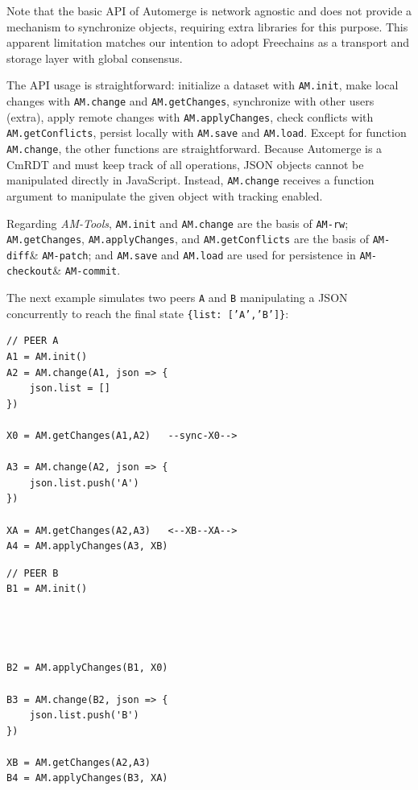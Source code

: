 \documentclass[12pt]{article}
\newcommand{\AMT}      {\emph{AM-Tools}\xspace}
\newcommand{\code}[1]  {\texttt{\footnotesize{#1}}}
\newcommand{\amrw}       {\texttt{AM-rw}\xspace}
\newcommand{\amdiff}     {\texttt{AM-diff}\xspace}
\newcommand{\ampatch}    {\texttt{AM-patch}\xspace}
\newcommand{\amcheckout} {\texttt{AM-checkout}\xspace}
\newcommand{\amcommit}   {\texttt{AM-commit}\xspace}
\begin{document}
Note that the basic API of Automerge is network agnostic and does not provide
a mechanism to synchronize objects, requiring extra libraries for this purpose.
%
This apparent limitation matches our intention to adopt Freechains as a
transport and storage layer with global consensus.

The API usage is straightforward:
    initialize a dataset with \code{AM.init},
    make local changes with \code{AM.change} and \code{AM.getChanges},
    synchronize with other users (extra),
    apply remote changes with \code{AM.applyChanges},
    check conflicts with \code{AM.getConflicts},
    persist locally with \code{AM.save} and \code{AM.load}.
Except for function \code{AM.change}, the other functions are straightforward.
%
Because Automerge is a CmRDT and must keep track of all operations, JSON
objects cannot be manipulated directly in JavaScript.
Instead, \code{AM.change} receives a function argument to manipulate
the given object with tracking enabled.

Regarding \AMT,
    \code{AM.init} and \code{AM.change} are the basis of \amrw;
    \code{AM.getChanges}, \code{AM.applyChanges}, and \code{AM.getConflicts}
    are the basis of \amdiff \& \ampatch; and
    \code{AM.save} and \code{AM.load} are used for persistence in
    \amcheckout \& \amcommit.

The next example simulates two peers \code{A} and \code{B} manipulating a
JSON concurrently to reach the final state \code{\{list:~['A','B']\}}:

\noindent
{\footnotesize
\begin{minipage}[t]{0.6\textwidth}
\begin{verbatim}
// PEER A
A1 = AM.init()
A2 = AM.change(A1, json => {
    json.list = []
})

X0 = AM.getChanges(A1,A2)   --sync-X0-->

A3 = AM.change(A2, json => {
    json.list.push('A')
})

XA = AM.getChanges(A2,A3)   <--XB--XA-->
A4 = AM.applyChanges(A3, XB)
\end{verbatim}
\end{minipage}
\begin{minipage}[t]{0.4\textwidth}
\begin{verbatim}
// PEER B
B1 = AM.init()




B2 = AM.applyChanges(B1, X0)

B3 = AM.change(B2, json => {
    json.list.push('B')
})

XB = AM.getChanges(A2,A3)
B4 = AM.applyChanges(B3, XA)
\end{verbatim}
\end{minipage}
}
\end{document}
